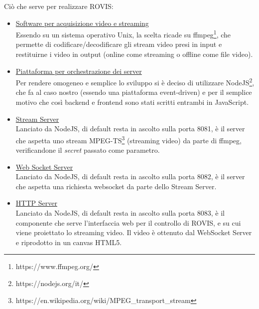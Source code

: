 \documentclass[11pt]{article}
\begin{document}
Ciò che serve per realizzare ROVIS:
\begin{itemize}
	\item \underline{Software per acquisizione video e streaming}\\
	Essendo su un sistema operativo Unix, la scelta ricade su ffmpeg\footnote{https://www.ffmpeg.org/}, che permette di codificare/decodificare gli stream video presi in input e restituirne i video in output (online come streaming o offline come file video).
	\item \underline{Piattaforma per orchestrazione dei server}\\
	Per rendere omogeneo e semplice lo sviluppo si è deciso di utilizzare NodeJS\footnote{https://nodejs.org/it/}, che fa al caso nostro (essendo una piattaforma event-driven) e per il semplice motivo che così backend e frontend sono stati scritti entrambi in JavaScript. 
	\item \underline{Stream Server}\\
	Lanciato da NodeJS, di default resta in ascolto sulla porta 8081, è il server che aspetta uno stream MPEG-TS\footnote{https://en.wikipedia.org/wiki/MPEG\_transport\_stream} (streaming video) da parte di ffmpeg, verificandone il \textit{secret} passato come parametro.
	\item \underline{Web Socket Server}\\
		Lanciato da NodeJS, di default resta in ascolto sulla porta 8082, è il server che aspetta una richiesta websocket da parte dello Stream Server.
	\item \underline{HTTP Server}\\
		Lanciato da NodeJS, di default resta in ascolto sulla porta 8083, è il componente che serve l'interfaccia web per il controllo di ROVIS, e su cui viene proiettato lo streaming video. Il video è ottenuto dal WebSocket Server e riprodotto in un canvas HTML5.
\end{itemize}
\end{document}
